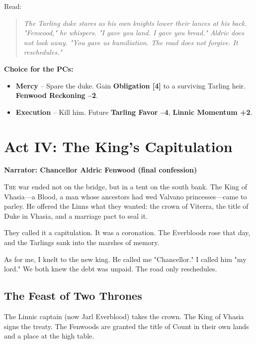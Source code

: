\documentclass[11pt]{book}
\begin{document}
Read:
\begin{quote}
\emph{The Tarling duke stares as his own knights lower their lances at his back. "Fenwood," he whispers. "I gave you land. I gave you bread."}
\emph{Aldric does not look away. "You gave us humiliation. The road does not forgive. It reschedules."}
\end{quote}

\textbf{Choice for the PCs:}
\begin{itemize}
    \item \textbf{Mercy} -- Spare the duke. Gain \textbf{Obligation [4]} to a surviving Tarling heir. \textbf{Fenwood Reckoning --2}.
    \item \textbf{Execution} -- Kill him. Future \textbf{Tarling Favor --4}, \textbf{Linnic Momentum +2}.
\end{itemize}

\clearpage

\chapter{Act IV: The King's Capitulation}
\textbf{Narrator: Chancellor Aldric Fenwood (final confession)}

\lettrine{T}{he} war ended not on the bridge, but in a tent on the south bank. The King of Vhasia---a Blood, a man whose ancestors had wed Valvano princesses---came to parley. He offered the Linns what they wanted: the crown of Viterra, the title of Duke in Vhasia, and a marriage pact to seal it.

They called it a capitulation. It was a coronation. The Everbloods rose that day, and the Tarlings sank into the marshes of memory.

As for me, I knelt to the new king. He called me "Chancellor." I called him "my lord." We both knew the debt was unpaid. The road only reschedules.

\section*{The Feast of Two Thrones}
The Linnic captain (now Jarl Everblood) takes the crown. The King of Vhasia signs the treaty. The Fenwoods are granted the title of Count in their own lands and a place at the high table.
\end{document}
